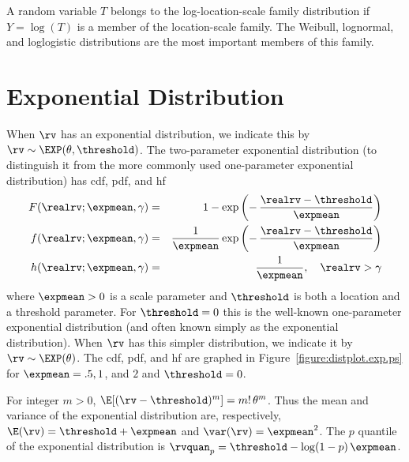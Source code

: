 A random variable $T$ belongs to the log-location-scale family
distribution if $Y=\log(T)$ is a member of the location-scale
family. The Weibull, lognormal, and loglogistic distributions are
the most important members of this family.


\section{Exponential Distribution}
\label{section:exponential.distribution}
When $\rv$ has an exponential distribution, we
indicate this by $\rv \sim \EXP(\theta,\threshold)$.
The two-parameter exponential distribution (to distinguish it from
the more commonly used one-parameter exponential distribution) has
cdf, pdf, and hf
\begin{eqnarray*}
 F(\realrv;\expmean,\gamma)&=&1-
\exp \left (-\,\frac{\realrv-\threshold}{\expmean} \right )
\\
 f(\realrv;\expmean,\gamma)&=& \frac{1}{\expmean} 
\exp \left (-\,\frac{\realrv-\threshold}{\expmean} \right ) \\ 
h(\realrv;\expmean,\gamma)&=&
\frac{1}{\expmean}, \quad \realrv > \gamma\\
\end{eqnarray*}
where $\expmean > 0$ is a scale parameter and $\threshold$ is both a
location and a threshold parameter. For $\threshold=0$ this is the
well-known one-parameter exponential distribution (and often known
simply as the exponential distribution).  When $\rv$
has this simpler distribution, we indicate it by $\rv \sim
\EXP(\theta)$. The cdf, pdf, and hf are graphed in
Figure~\ref{figure:distplot.exp.ps} for $\expmean=.5, 1$, and $2$ and
$\threshold=0$.

For integer $m > 0$, $\E[(\rv-\threshold)^{m}] = m!\, 
\theta^{m} $. Thus the mean and variance of the exponential distribution
are, respectively, $\E(\rv)= \threshold + \expmean$ and $\var(\rv)= 
\expmean^{2}$.
The $p$ quantile of the exponential distribution is
$\rvquan_{p}=\threshold -\log(1-p)\, \expmean$. 

